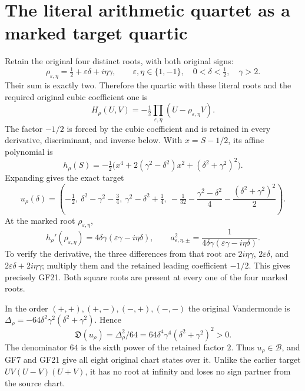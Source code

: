 \section{The literal arithmetic quartet as a marked target quartic}
Retain the original four distinct roots, with both original signs:
\[
 \rho_{\varepsilon,\eta}=\tfrac12+\varepsilon\delta+i\eta\gamma,
 \qquad\varepsilon,\eta\in\{1,-1\},\quad
 0<\delta<\tfrac12,\quad\gamma>2.
\]
Their sum is exactly two. Therefore the quartic with these literal
roots and the required original cubic coefficient one is
\begin{equation}
 H_\rho(U,V)=-\tfrac12\prod_{\varepsilon,\eta}
                    (U-\rho_{\varepsilon,\eta}V).\tag{GF19}
\end{equation}
The factor $-1/2$ is forced by the cubic coefficient and is retained
in every derivative, discriminant, and inverse below. With
$x=S-1/2$, its affine polynomial is
\[
 h_\rho(S)=-\tfrac12\bigl(x^4+2(\gamma^2-\delta^2)x^2
                              +(\delta^2+\gamma^2)^2\bigr).
\]
Expanding gives the exact target
\begin{equation}
 u_\rho(\delta)=\left(-\tfrac12,\
 \delta^2-\gamma^2-\tfrac34,\
 \gamma^2-\delta^2+\tfrac14,\
 -\tfrac1{32}-\frac{\gamma^2-\delta^2}{4}
                     -\frac{(\delta^2+\gamma^2)^2}{2}\right).
 \tag{GF20}
\end{equation}
At the marked root $\rho_{\varepsilon,\eta}$,
\begin{equation}
 h_\rho'(\rho_{\varepsilon,\eta})
       =4\delta\gamma(\varepsilon\gamma-i\eta\delta),\qquad
 a_{\varepsilon,\eta,\pm}^{2}
       =\frac1{4\delta\gamma(\varepsilon\gamma-i\eta\delta)}.
 \tag{GF21}
\end{equation}
To verify the derivative, the three differences from that root are
$2i\eta\gamma$, $2\varepsilon\delta$, and
$2\varepsilon\delta+2i\eta\gamma$; multiply them and the retained
leading coefficient $-1/2$. This gives precisely GF21. Both square
roots are present at every one of the four marked roots.

In the order $(+,+),(+,-),(-,+),(-,-)$ the original Vandermonde is
$\Delta_\rho=-64\delta^2\gamma^2(\delta^2+\gamma^2)$. Hence
\begin{equation}
 \mathfrak D(u_\rho)=\Delta_\rho^2/64
                   =64\delta^4\gamma^4(\delta^2+\gamma^2)^2>0.
 \tag{GF22}
\end{equation}
The denominator $64$ is the sixth power of the retained factor
$2$. Thus $u_\rho\in\mathcal B$, and GF7 and GF21 give all
eight original chart states over it. Unlike the earlier target
$UV(U-V)(U+V)$, it has no root at infinity and loses no sign
partner from the source chart.

